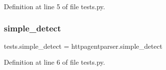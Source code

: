 Definition at line 5 of file tests.\+py.

\hypertarget{namespacetests_a349a0d1c213c5df3fe24efe9444bd570}{}\label{namespacetests_a349a0d1c213c5df3fe24efe9444bd570} 
\subsubsection{\texorpdfstring{simple\+\_\+detect}{simple\_detect}}
{\footnotesize\ttfamily tests.\+simple\+\_\+detect = httpagentparser.\+simple\+\_\+detect}



Definition at line 6 of file tests.\+py.

